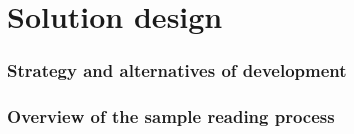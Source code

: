 \chapter{Solution design}\label{chapter:soldesign}


\subsection{Strategy and alternatives of development}\label{subsection:strat}

\subsection{Overview of the sample reading process}\label{subsection:sr-proc}



